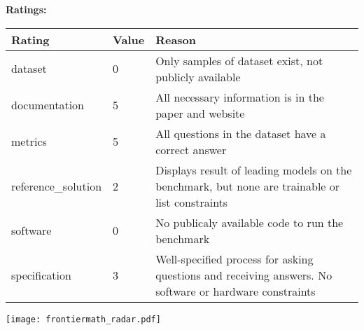 {{{\bf Ratings:} ~ \\

\begin{tabular}{p{} p{} p{}}
\hline
Rating & Value & Reason \\
\hline
dataset & 0 & Only samples of dataset exist, not publicly available
 \\
documentation & 5 & All necessary information is in the paper and website
 \\
metrics & 5 & All questions in the dataset have a correct answer
 \\
reference\_solution & 2 & Displays result of leading models on the benchmark, but none are trainable or list constraints
 \\
software & 0 & No publicaly available code to run the benchmark
 \\
specification & 3 & Well-specified process for asking questions and receiving answers. No software or hardware constraints
 \\
\hline
\end{tabular}

\texttt{[image: frontiermath\_radar.pdf]}
}}
\clearpage